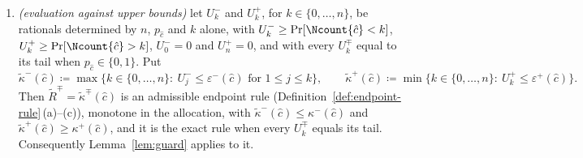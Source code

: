 \begin{proposition}
\begin{enumerate}[label=(\roman*),leftmargin=2.2em]
\begin{align}
      <\Pr\big[\Ncount{\hat c}\ge\lceil np\rceil-1\big].
    \label{eq:guard-up1}
\end{align}
Measured instead from the honest value, the guard costs at most $1/n$
unconditionally, \eqref{eq:guard-from-p} of Lemma~\ref{lem:guard}\,(iv);
\item \emph{(evaluation against upper bounds)} let $U^{-}_k$ and $U^{+}_k$,
for $k\in\{0,\dots,n\}$, be rationals determined by $n$, $p_{\hat c}$ and
$k$ alone, with
$U^{-}_k\ge\Pr[\Ncount{\hat c}<k]$, $U^{+}_k\ge\Pr[\Ncount{\hat c}>k]$,
$U^{-}_0=0$ and $U^{+}_n=0$, and with every $U^{\mp}_k$ equal to its tail
when $p_{\hat c}\in\{0,1\}$. Put
\begin{equation*}
  \tilde\kappa^{-}(\hat c)\coloneqq\max\big\{k\in\{0,\dots,n\}:\
    U^{-}_{j}\le\varepsilon^{-}(\hat c)\text{ for }1\le j\le k\big\},
  \qquad
  \tilde\kappa^{+}(\hat c)\coloneqq\min\big\{k\in\{0,\dots,n\}:\
    U^{+}_{k}\le\varepsilon^{+}(\hat c)\big\}.
\end{equation*}
Then $\tilde R^{\mp}=\tilde\kappa^{\mp}(\hat c)$ is an admissible endpoint
rule (Definition~\ref{def:endpoint-rule}\,(a)--(c)), monotone in the
allocation, with $\tilde\kappa^{-}(\hat c)\le\kappa^{-}(\hat c)$ and
$\tilde\kappa^{+}(\hat c)\ge\kappa^{+}(\hat c)$, and it is the exact rule
when every $U^{\mp}_k$ equals its tail. Consequently Lemma~\ref{lem:guard}
applies to it.
\end{enumerate}
\end{proposition}

